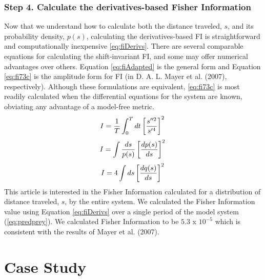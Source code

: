 \documentclass[12pt,twoside,openany]{reedthesis}
\begin{document}
\subsubsection{\texorpdfstring{\textbf{Step 4.} Calculate the
derivatives-based Fisher
Information}{Step 4. Calculate the derivatives-based Fisher Information}}\label{step-4.-calculate-the-derivatives-based-fisher-information}

Now that we understand how to calculate both the distance traveled,
\(s\), and its probability density, \(p(s)\), calculating the
derivatives-based FI is straightforward and computationally inexpensive
\eqref{eq:fiDerivs}. There are several comparable equations for
calculating the shift-invariant FI, and some may offer numerical
advantages over others. Equation \eqref{eq:fiAdapted} is the general form
and Equation \eqref{eq:fi73c} is the amplitude form for FI (in D. A. L.
Mayer et al. (2007), respectively). Although these formulations are
equivalent, \eqref{eq:fi73c} is most readily calculated when the
differential equations for the system are known, obviating any advantage
of a model-free metric.
\begin{equation}   
    I = \frac{1}{T} \int_0^T dt\left[\frac{s''^2}{s'^4}\right]^2 \\  
  \label{eq:fiDerivs}  
\end{equation}
\begin{equation} 
    I = \int \frac{ds}{p(s)}\left[\frac{dp(s)}{ds}\right]^2  \\
    \label{eq:fiAdapted}
\end{equation}
\begin{equation} 
    I = 4 \int ds\left[\frac{dq(s)}{ds}\right]^2 \\
\label{eq:fi73c}
\end{equation}
This article is interested in the Fisher Information calculated for a
distribution of distance traveled, \(s\), by the entire system. We
calculated the Fisher Information value using Equation \eqref{eq:fiDerivs}
over a single period of the model system (\eqref{eq:predprey}). We
calculated Fisher Information to be \(5.3\) x \(10^{-5}\) which is
consistent with the results of Mayer et al. (2007).

\section{Case Study}\label{case-study}
\end{document}

